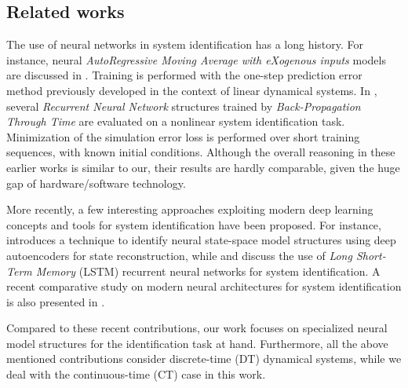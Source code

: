 \documentclass{article} %
\begin{document}
{\subsection{Related works}}
The use of neural networks in system identification has a long history. For instance, neural \emph{AutoRegressive Moving Average with eXogenous inputs} models are discussed  in \cite{chen1990non}. Training is performed with the one-step prediction error method \citep{ljung1978convergence} previously developed in the context of linear dynamical systems.
In \citep{horne1995experimental}, several \emph{Recurrent Neural Network} structures trained by \emph{Back-Propagation Through Time} are evaluated on a nonlinear system identification task. {Minimization of the simulation error loss is performed over short training sequences, with known initial conditions.}
Although the overall reasoning in these earlier works is similar to our, their results are hardly comparable, given the huge gap of hardware/software technology.

More recently, a few interesting approaches exploiting modern deep learning concepts and tools for system identification have been proposed. {For instance, \cite{masti2018learning} introduces a technique to identify neural state-space model structures using deep autoencoders for state reconstruction}, while \cite{gonzalez2018non} and \cite{wang2017new} discuss the use of \emph{Long Short-Term Memory} (LSTM) recurrent neural networks for system identification. {A recent comparative study on modern neural architectures for system identification is also presented in \cite{kumar2019comparative}}.  

Compared to these recent contributions, our work focuses on specialized neural model structures for the identification task at hand. 
Furthermore, all the above mentioned contributions consider discrete-time (DT) dynamical systems, while we deal with the continuous-time (CT) case in this work.
\end{document}
